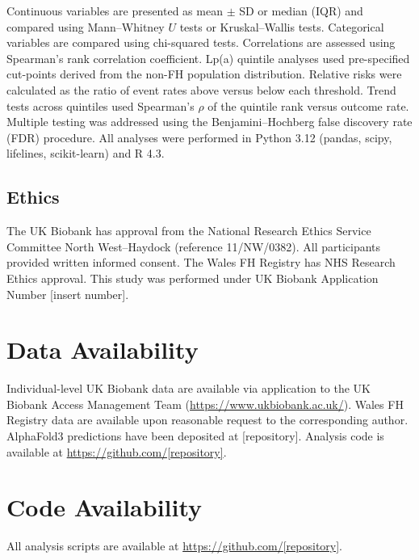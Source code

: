 \documentclass[11pt,a4paper]{article}
\newcommand{\lpa}{Lp(a)}
\newcommand{\ukb}{UK Biobank}
\begin{document}
Continuous variables are presented as mean $\pm$ SD or median (IQR) and compared using Mann--Whitney $U$ tests or Kruskal--Wallis tests. Categorical variables are compared using chi-squared tests. Correlations are assessed using Spearman's rank correlation coefficient. \lpa{} quintile analyses used pre-specified cut-points derived from the non-FH population distribution. Relative risks were calculated as the ratio of event rates above versus below each threshold. Trend tests across quintiles used Spearman's $\rho$ of the quintile rank versus outcome rate. Multiple testing was addressed using the Benjamini--Hochberg false discovery rate (FDR) procedure. All analyses were performed in Python 3.12 (pandas, scipy, lifelines, scikit-learn) and R 4.3.

\subsection*{Ethics}

The \ukb{} has approval from the National Research Ethics Service Committee North West--Haydock (reference 11/NW/0382). All participants provided written informed consent. The Wales FH Registry has NHS Research Ethics approval. This study was performed under \ukb{} Application Number [insert number].

\section*{Data Availability}

Individual-level \ukb{} data are available via application to the UK Biobank Access Management Team (\url{https://www.ukbiobank.ac.uk/}). Wales FH Registry data are available upon reasonable request to the corresponding author. AlphaFold3 predictions have been deposited at [repository]. Analysis code is available at \url{https://github.com/[repository]}.

\section*{Code Availability}

All analysis scripts are available at \url{https://github.com/[repository]}.

\end{document}
